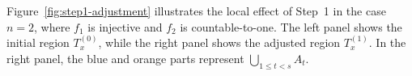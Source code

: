\documentclass[11pt, reqno, a4paper]{amsart}
\theoremstyle{definition}
\theoremstyle{plain}
\begin{document}
Figure~\ref{fig:step1-adjustment} illustrates the local effect of
Step~1 in the case $n=2$, where $f_1$ is injective and $f_2$ is
countable-to-one. The left panel shows the initial region
$T_x^{(0)}$, while the right panel shows the adjusted region
$T_x^{(1)}$. In the right panel, the blue and orange parts represent
$\bigcup_{1\le t<s} A_t$.

\begin{figure}[htbp]
    \centering



\begin{tikzpicture}[x=0.75pt,y=0.75pt,yscale=-1,xscale=1]


\end{tikzpicture}
\end{figure}
\end{document}
